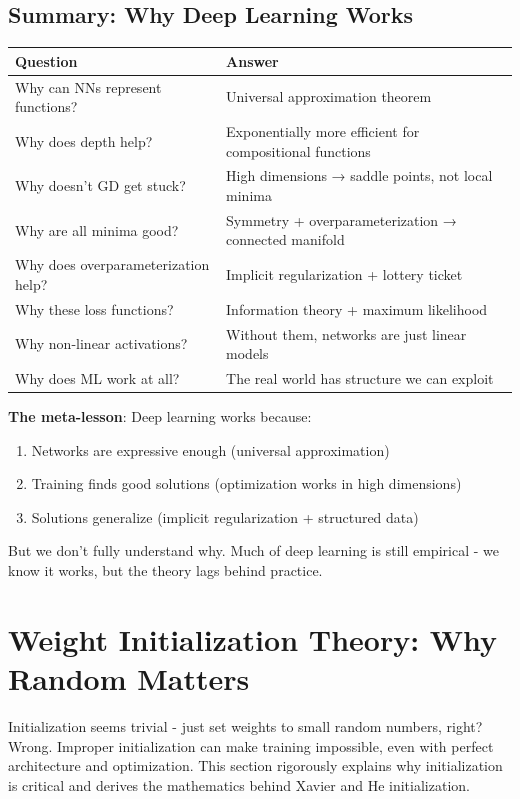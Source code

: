 \subsection{Summary: Why Deep Learning Works}

\begin{table}[h]
\centering
\begin{tabular}{ll}
\toprule
\textbf{Question} & \textbf{Answer} \\
\midrule
Why can NNs represent functions? & Universal approximation theorem \\
Why does depth help? & Exponentially more efficient for compositional functions \\
Why doesn't GD get stuck? & High dimensions → saddle points, not local minima \\
Why are all minima good? & Symmetry + overparameterization → connected manifold \\
Why does overparameterization help? & Implicit regularization + lottery ticket \\
Why these loss functions? & Information theory + maximum likelihood \\
Why non-linear activations? & Without them, networks are just linear models \\
Why does ML work at all? & The real world has structure we can exploit \\
\bottomrule
\end{tabular}
\end{table}

\textbf{The meta-lesson}: Deep learning works because:
\begin{enumerate}
\item Networks are expressive enough (universal approximation)
\item Training finds good solutions (optimization works in high dimensions)
\item Solutions generalize (implicit regularization + structured data)
\end{enumerate}

But we don't fully understand why. Much of deep learning is still empirical - we know it works, but the theory lags behind practice.

\section{Weight Initialization Theory: Why Random Matters}

Initialization seems trivial - just set weights to small random numbers, right? Wrong. Improper initialization can make training impossible, even with perfect architecture and optimization. This section rigorously explains why initialization is critical and derives the mathematics behind Xavier and He initialization.


